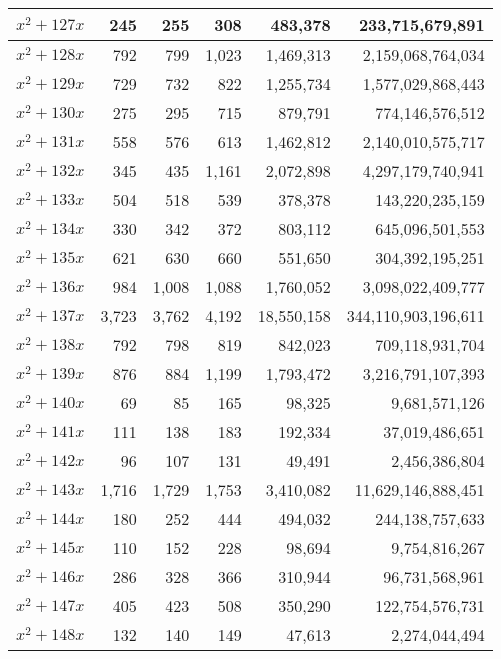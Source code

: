 \documentclass{article}
\begin{document}
\begin{center}
\begin{tabular}{ | c | r | r | r | r | r | }
$x^2 + 127x$ & 245 & 255 & 308 & 483{,}378 & 233{,}715{,}679{,}891 \\ \hline
$x^2 + 128x$ & 792 & 799 & 1{,}023 & 1{,}469{,}313 & 2{,}159{,}068{,}764{,}034 \\ \hline
$x^2 + 129x$ & 729 & 732 & 822 & 1{,}255{,}734 & 1{,}577{,}029{,}868{,}443 \\ \hline
$x^2 + 130x$ & 275 & 295 & 715 & 879{,}791 & 774{,}146{,}576{,}512 \\ \hline
$x^2 + 131x$ & 558 & 576 & 613 & 1{,}462{,}812 & 2{,}140{,}010{,}575{,}717 \\ \hline
$x^2 + 132x$ & 345 & 435 & 1{,}161 & 2{,}072{,}898 & 4{,}297{,}179{,}740{,}941 \\ \hline
$x^2 + 133x$ & 504 & 518 & 539 & 378{,}378 & 143{,}220{,}235{,}159 \\ \hline
$x^2 + 134x$ & 330 & 342 & 372 & 803{,}112 & 645{,}096{,}501{,}553 \\ \hline
$x^2 + 135x$ & 621 & 630 & 660 & 551{,}650 & 304{,}392{,}195{,}251 \\ \hline
$x^2 + 136x$ & 984 & 1{,}008 & 1{,}088 & 1{,}760{,}052 & 3{,}098{,}022{,}409{,}777 \\ \hline
$x^2 + 137x$ & 3{,}723 & 3{,}762 & 4{,}192 & 18{,}550{,}158 & 344{,}110{,}903{,}196{,}611 \\ \hline
$x^2 + 138x$ & 792 & 798 & 819 & 842{,}023 & 709{,}118{,}931{,}704 \\ \hline
$x^2 + 139x$ & 876 & 884 & 1{,}199 & 1{,}793{,}472 & 3{,}216{,}791{,}107{,}393 \\ \hline
$x^2 + 140x$ & 69 & 85 & 165 & 98{,}325 & 9{,}681{,}571{,}126 \\ \hline
$x^2 + 141x$ & 111 & 138 & 183 & 192{,}334 & 37{,}019{,}486{,}651 \\ \hline
$x^2 + 142x$ & 96 & 107 & 131 & 49{,}491 & 2{,}456{,}386{,}804 \\ \hline
$x^2 + 143x$ & 1{,}716 & 1{,}729 & 1{,}753 & 3{,}410{,}082 & 11{,}629{,}146{,}888{,}451 \\ \hline
$x^2 + 144x$ & 180 & 252 & 444 & 494{,}032 & 244{,}138{,}757{,}633 \\ \hline
$x^2 + 145x$ & 110 & 152 & 228 & 98{,}694 & 9{,}754{,}816{,}267 \\ \hline
$x^2 + 146x$ & 286 & 328 & 366 & 310{,}944 & 96{,}731{,}568{,}961 \\ \hline
$x^2 + 147x$ & 405 & 423 & 508 & 350{,}290 & 122{,}754{,}576{,}731 \\ \hline
$x^2 + 148x$ & 132 & 140 & 149 & 47{,}613 & 2{,}274{,}044{,}494 \\ \hline

\end{tabular}
\end{center}
\end{document}
